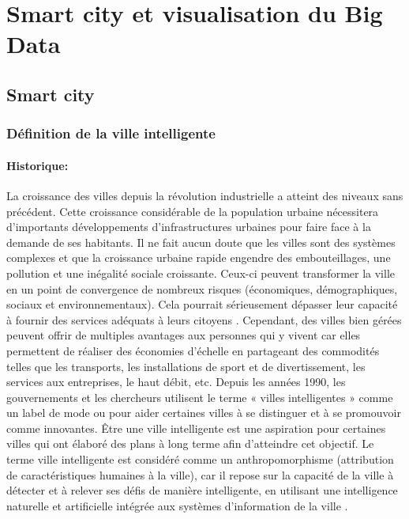 \documentclass[french, a4paper, 12pt]{report}
\begin{document}
\chapter{Smart city  et  visualisation du Big Data}
\section{Smart city}
\subsection{Définition de la ville intelligente}
\subsubsection{Historique:}
La croissance des villes depuis la révolution industrielle a atteint des niveaux sans précédent. 
Cette croissance considérable de la population urbaine nécessitera d’importants développements d’infrastructures urbaines pour faire face à la demande de ses habitants. Il ne fait aucun doute que les villes sont des systèmes complexes et que la croissance urbaine rapide engendre des embouteillages, une pollution et une inégalité sociale croissante. Ceux-ci peuvent transformer la ville en un point de convergence de nombreux risques (économiques, démographiques, sociaux et environnementaux). Cela pourrait sérieusement dépasser leur capacité à fournir des services adéquats à leurs citoyens \cite{1}. Cependant, des villes bien gérées peuvent offrir de multiples avantages aux personnes qui y vivent car elles permettent de réaliser des économies d’échelle en partageant des commodités telles que les transports, les installations de sport et de divertissement, les services aux entreprises, le haut débit, etc.
Depuis les années 1990, les gouvernements et les chercheurs utilisent le terme « villes intelligentes » comme un label de mode ou pour aider certaines villes à se distinguer et à se promouvoir comme innovantes. Être une ville intelligente est une aspiration pour certaines villes qui ont élaboré des plans à long terme afin d’atteindre cet objectif. Le terme ville intelligente est considéré comme un anthropomorphisme (attribution de caractéristiques humaines à la ville), car il repose sur la capacité de la ville à détecter et à relever ses défis de manière intelligente, en utilisant une intelligence naturelle et artificielle intégrée aux systèmes d’information de la ville \cite{2}.
\end{document}
